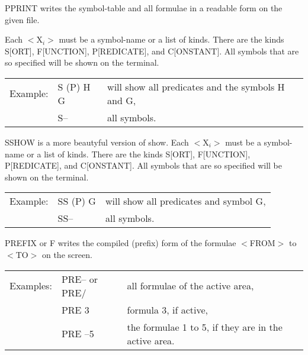 %
{PPRINT writes the symbol-table and all formulae in a readable form on the 
given file. }

%                
{Each $<$X$_i$$>$ must be a symbol-name or a list of kinds. 
There are the kinds S[ORT], F[UNCTION], P[REDICATE], and C[ONSTANT]. All 
symbols that are so specified will be shown on the terminal. 

\begin{tabular}{lll}
Example:&	S (P) H G & will show all predicates and the symbols H and G,\\
	& S--      &  all symbols. 
\end{tabular}}

%                
{SSHOW is a more beautyful version of show.
Each $<$X$_i$$>$ must be a symbol-name or a list of kinds. 
There are the kinds S[ORT], F[UNCTION], P[REDICATE], and C[ONSTANT]. All 
symbols that are so specified will be shown on the terminal.

\begin{tabular}{lll}
Example:&	SS (P) G & will show all predicates and symbol G,\\
	& SS--      &  all symbols. 
\end{tabular}}

%                
{PREFIX or F writes the compiled (prefix) form of the formulae $<$FROM$>$  to 
$<$TO$>$ on the screen. 
\begin{tabular}{lll}
Examples:&	PRE-- or  PRE/  & all formulae of the active area,\\
&	PRE 3        &       formula 3, if active, \\
&	PRE --5        &     the formulae 1 to 5, if they are in the active 
area.
\end{tabular}}



